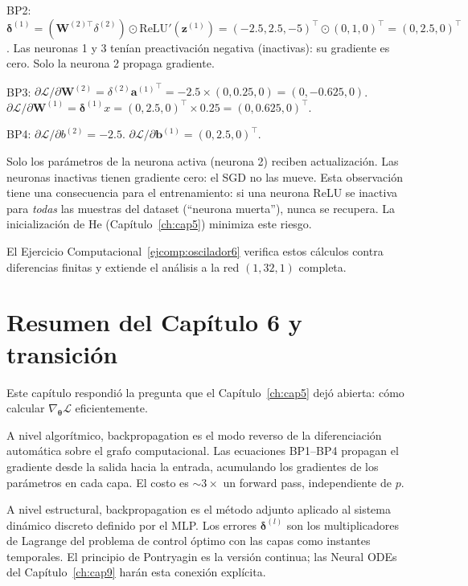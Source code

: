 BP2: $\bm{\delta}^{(1)} = (\bm{W}^{(2)\top}\delta^{(2)}) \odot
\text{ReLU}'(\bm{z}^{(1)}) = (-2.5, 2.5, -5)^\top \odot (0, 1, 0)^\top
= (0, 2.5, 0)^\top$.
Las neuronas 1 y 3 tenían preactivación negativa (inactivas): su
gradiente es cero. Solo la neurona 2 propaga gradiente.

BP3: $\partial\mathcal{L}/\partial\bm{W}^{(2)} =
\delta^{(2)}{\bm{a}^{(1)}}^\top = -2.5 \times (0, 0.25, 0)
= (0, -0.625, 0)$.
$\partial\mathcal{L}/\partial\bm{W}^{(1)} =
\bm{\delta}^{(1)} x = (0, 2.5, 0)^\top \times 0.25
= (0, 0.625, 0)^\top$.

BP4: $\partial\mathcal{L}/\partial b^{(2)} = -2.5$.
$\partial\mathcal{L}/\partial\bm{b}^{(1)} = (0, 2.5, 0)^\top$.

Solo los parámetros de la neurona activa (neurona 2) reciben
actualización. Las neuronas inactivas tienen gradiente cero: el SGD no
las mueve. Esta observación tiene una consecuencia para el entrenamiento:
si una neurona ReLU se inactiva para \emph{todas} las muestras del
dataset (``neurona muerta''), nunca se recupera. La inicialización de He
(Capítulo~\ref{ch:cap5}) minimiza este riesgo.

El Ejercicio Computacional~\ref{ejcomp:oscilador6} verifica estos cálculos
contra diferencias finitas y extiende el análisis a la red $(1, 32, 1)$
completa.

\section{Resumen del Capítulo 6 y transición}
\label{sec:resumen6}

Este capítulo respondió la pregunta que el Capítulo~\ref{ch:cap5} dejó
abierta: cómo calcular $\nabla_{\bm{\theta}}\mathcal{L}$ eficientemente.

A nivel algorítmico, backpropagation es el modo reverso de la
diferenciación automática sobre el grafo computacional. Las ecuaciones
BP1–BP4 propagan el gradiente desde la salida hacia la entrada,
acumulando los gradientes de los parámetros en cada capa. El costo es
$\sim 3\times$ un forward pass, independiente de $p$.

A nivel estructural, backpropagation es el método adjunto aplicado al
sistema dinámico discreto definido por el MLP. Los errores
$\bm{\delta}^{(l)}$ son los multiplicadores de Lagrange del problema de
control óptimo con las capas como instantes temporales. El principio de
Pontryagin es la versión continua; las Neural ODEs del
Capítulo~\ref{ch:cap9} harán esta conexión explícita.

